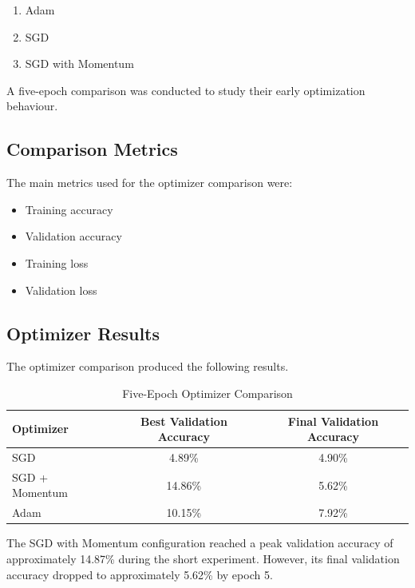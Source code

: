 \documentclass[12pt,a4paper]{report}
\begin{document}
\begin{enumerate}
    \item Adam
    \item SGD
    \item SGD with Momentum
\end{enumerate}

A five-epoch comparison was conducted to study their early
optimization behaviour.

\subsection{Comparison Metrics}

The main metrics used for the optimizer comparison were:

\begin{itemize}
    \item Training accuracy
    \item Validation accuracy
    \item Training loss
    \item Validation loss
\end{itemize}

\subsection{Optimizer Results}

The optimizer comparison produced the following results.

\begin{table}[H]
\centering
\caption{Five-Epoch Optimizer Comparison}
\label{tab:optimizer-comparison}

\begin{tabular}{lcc}
\toprule
\textbf{Optimizer} &
\textbf{Best Validation Accuracy} &
\textbf{Final Validation Accuracy} \\
\midrule
SGD & 4.89\% & 4.90\% \\
SGD + Momentum &  14.86\% & 5.62\% \\
Adam & 10.15\% & 7.92\% \\
\bottomrule
\end{tabular}

\end{table}

The SGD with Momentum configuration reached a peak validation
accuracy of approximately 14.87\% during the short experiment.
However, its final validation accuracy dropped to approximately
5.62\% by epoch 5.
\end{document}

